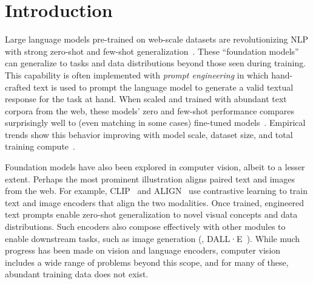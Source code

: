 \documentclass[10pt,twocolumn,letterpaper]{article}
\newcommand{\sad}{\mbox{SA-1B}\xspace}
\newcommand{\sam}{SAM\xspace}
\begin{document}
\begin{abstract}\vspace{-3mm}
We introduce the Segment Anything (SA) project: a new task, model, and dataset for image segmentation. Using our efficient model in a data collection loop, we built the largest segmentation dataset to date (by far), with over 1 \textbf{billion} masks on 11M licensed and privacy respecting images. The model is designed and trained to be promptable, so it can transfer zero-shot to new image distributions and tasks. We evaluate its capabilities on numerous tasks and find that its zero-shot performance is impressive -- often competitive with or even superior to prior fully supervised results. We are releasing the Segment Anything Model (\sam) and corresponding dataset (\sad) of 1B masks and 11M images at \href{https://segment-anything.com}{https://segment-anything.com} to foster research into foundation models for computer vision.
\vspace{-3mm}
\end{abstract}

\section{Introduction}\label{sec:intro}

Large language models pre-trained on web-scale datasets are revolutionizing NLP with strong zero-shot and few-shot generalization~\cite{Brown2020}. These ``foundation models''~\cite{bommasani2021opportunities} can generalize to tasks and data distributions beyond those seen during training. This capability is often implemented with \emph{prompt engineering} in which hand-crafted text is used to prompt the language model to generate a valid textual response for the task at hand. When scaled and trained with abundant text corpora from the web, these models' zero and few-shot performance compares surprisingly well to (even matching in some cases) fine-tuned models~\cite{Brown2020,chowdhery2022palm}. Empirical trends show this behavior improving with model scale, dataset size, and total training compute~\cite{kaplan2020scaling,Brown2020,chowdhery2022palm,hoffmann2022training}.

Foundation models have also been explored in computer vision, albeit to a lesser extent. Perhaps the most prominent illustration aligns paired text and images from the web. For example, CLIP~\cite{Radford2021} and ALIGN~\cite{jia2021scaling} use contrastive learning to train text and image encoders that align the two modalities. Once trained, engineered text prompts enable zero-shot generalization to novel visual concepts and data distributions. Such encoders also compose effectively with other modules to enable downstream tasks, such as image generation (\eg, DALL·E~\cite{Ramesh2021}). While much progress has been made on vision and language encoders, computer vision includes a wide range of problems beyond this scope, and for many of these, abundant training data does not exist.
\end{document}

